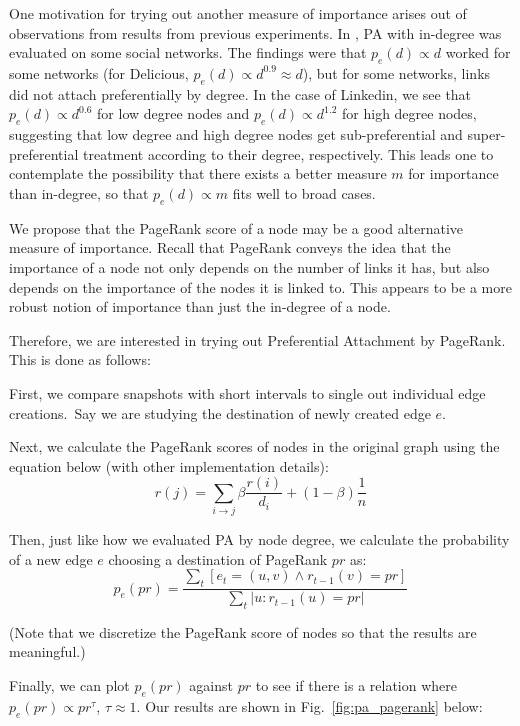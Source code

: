 \documentclass[10pt,twocolumn]{article}
\begin{document}
One motivation for trying out another measure of importance arises out of observations from results from previous experiments. In \cite{leskovec2008microscopic}, PA with in-degree was evaluated on some social networks. The findings were that $p_e(d)\propto d$ worked for some networks (for Delicious, $p_e(d)\propto d^{0.9}\approx d$), but for some networks, links did not attach preferentially by degree. In the case of Linkedin, we see that $p_e(d)\propto d^{0.6}$ for low degree nodes and $p_e(d)\propto d^{1.2}$ for high degree nodes, suggesting that low degree and high degree nodes get sub-preferential and super-preferential treatment according to their degree, respectively. This leads one to contemplate the possibility that there exists a better measure $m$ for importance than in-degree, so that $p_e(d)\propto m$ fits well to broad cases. 

We propose that the PageRank score of a node may be a good alternative measure of importance. Recall that PageRank conveys the idea that the importance of a node not only depends on the number of links it has, but also depends on the importance of the nodes it is linked to. This appears to be a more robust notion of importance than just the in-degree of a node.

Therefore, we are interested in trying out Preferential Attachment by PageRank. This is done as follows:

First, we compare snapshots with short intervals to single out individual edge creations.~Say we are studying the destination of newly created edge $e$.

Next, we calculate the PageRank scores of nodes in the original graph using the equation below (with other implementation details):
\begin{equation}
\label{3}
r(j)=\sum\limits_{i\rightarrow j}\beta\frac{r(i)}{d_i}+(1-\beta)\frac{1}{n}
\end{equation}

Then, just like how we evaluated PA by node degree, we calculate the probability of a new edge $e$ choosing a destination of PageRank $pr$ as:
\begin{equation}
\label{4}
p_e(pr)=\frac{\sum\limits_{t}[e_t=(u,v)\wedge r_{t-1}(v)=pr]}{\sum\limits_{t}|u:r_{t-1}(u)=pr|}
\end{equation}

(Note that we discretize the PageRank score of nodes so that the results are meaningful.)

Finally, we can plot $p_e(pr)$ against $pr$ to see if there is a relation where $p_e(pr)\propto pr^\tau$, $\tau \approx 1$. Our results are shown in Fig.~\ref{fig:pa_pagerank} below:
\end{document}
